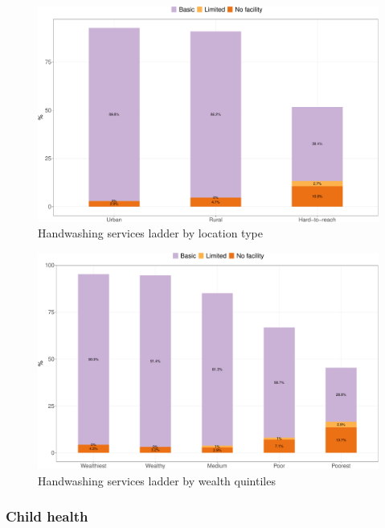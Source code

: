 \documentclass[12pt,a4paper]{article}
\begin{document}
\newpage

\begin{figure}[H]

{\centering \includegraphics{kayahReport_files/figure-latex/handwashing1plot-1} 

}

\caption{Handwashing services ladder by location type}\label{fig:handwashing1plot}
\end{figure}

\begin{figure}[H]

{\centering \includegraphics{kayahReport_files/figure-latex/handwashing2plot-1} 

}

\caption{Handwashing services ladder by wealth quintiles}\label{fig:handwashing2plot}
\end{figure}

\hypertarget{chealth-results}{%
\subsubsection{Child health}\label{chealth-results}}
\end{document}
